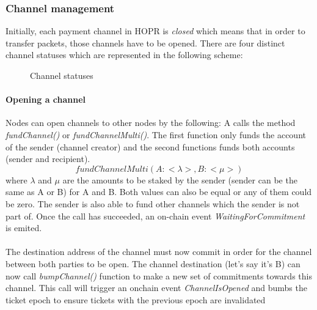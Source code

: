 \subsubsection{Channel management}
Initially, each payment channel in HOPR is \textit{closed} which means that in order to transfer packets, those channels have to be opened. There are four distinct channel statuses which are represented in the following scheme:
\begin{figure}[H]
    \begin{center}
        

\end{center}
\label{fig:channel statuses}
    \caption{Channel statuses}
\end{figure}
\paragraph{Opening a channel} Nodes can open channels to other nodes by the following:
A calls the method \textit{fundChannel()} or \textit{fundChannelMulti()}. The first function only funds the account of the sender (channel creator) and the second functions funds both accounts (sender and recipient). 
$$fundChannelMulti(A: <\lambda>, B:<\mu> )$$ where $\lambda$ and $\mu$ are the amounts to be staked by the sender (sender can be the same as A or B) for A and B. Both values can also be equal or any of them could be zero. The sender is also able to fund other channels which the sender is not part of.
Once the call has succeeded, an on-chain event \textit{WaitingForCommitment} is emited. 
\\~\\The destination address of the channel must now commit in order for the channel between both parties to be open. 
The channel destination (let's say it's B) can now call \textit{bumpChannel()} function to make a new set of commitments towards this channel. This call will trigger an onchain event \textit{ChannelIsOpened} and bumbs the ticket epoch to ensure tickets with the previous epoch are invalidated
